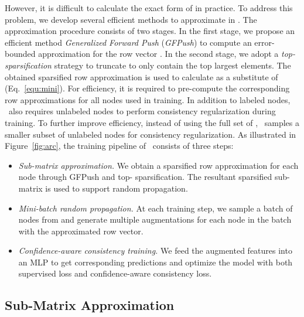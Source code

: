 However, it is difficult to calculate the exact form of  in practice. 
To address this problem, we develop several efficient methods to approximate  in \model. 
The approximation procedure consists of two stages. 
In the first stage, we propose an efficient method \textit{Generalized Forward Push} (\textit{GFPush}) to compute an error-bounded approximation  for the row vector . 
In the second stage, we adopt a \textit{top- sparsification} strategy to truncate  to only contain the top  largest elements. 
The obtained sparsified row approximation  is used to calculate  as a substitute of  (Eq.~\ref{equ:mini}). 
For efficiency, it is required to pre-compute the corresponding row approximations for all nodes used in training.
In addition to labeled nodes,
\model\ also requires unlabeled nodes to perform consistency regularization during training. 
 To further improve efficiency, instead of using the full set of  ,  \model\ samples a smaller subset of unlabeled nodes  for consistency regularization.
As illustrated in Figure~\ref{fig:arc}, the training pipeline of \model\ consists of three steps:
\begin{itemize}
    \item \textit{Sub-matrix approximation.} 
    We obtain a sparsified row approximation  for each node  through GFPush and top- sparsification. 
    The resultant sparsified sub-matrix is used to support random propagation. 
    \item \textit{Mini-batch random propagation.} 
    At each training step, we sample a batch of nodes from  and generate multiple augmentations for each node in the batch with the approximated row vector.
    \item \textit{Confidence-aware consistency training.} 
    We feed the augmented features into an MLP to get corresponding predictions and optimize the model with both supervised loss and confidence-aware consistency loss.
\end{itemize}













\subsection{Sub-Matrix Approximation}


